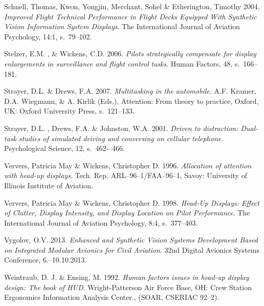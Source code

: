 \documentclass[utf8,bachelor,manualbib]{gradu3}
\begin{document}
\begin{thebibliography}{}
Schnell, Thomas,  Kwon, Yongjin, Merchant, Sohel \& Etherington, Timothy 2004.
\textit{Improved Flight Technical Performance in Flight Decks Equipped With Synthetic Vision Information System Displays}.
The International Journal of Aviation Psychology, 14:1, s.~79--102.

Stelzer, E.M. , \& Wickens, C.D. 2006.
\textit{Pilots strategically compensate for display enlargements in surveillance and flight control tasks}.
Human Factors, 48, s.~166--181.

Strayer, D.L. \& Drews, F.A. 2007.
\textit{Multitasking in the automobile}.
A.F. Kramer, D.A. Wiegmann, \& A. Kirlik (Eds.), Attention: From theory to practice, Oxford, UK: Oxford University Press, s.~121--133.

Strayer, D.L. , Drews, F.A. \& Johnston, W.A. 2001.
\textit{Driven to distraction: Dual-task studies of simulated
driving and conversing on cellular telephone}.
Psychological Science, 12, s.~462-–466.

Ververs, Patricia May \& Wickens, Christopher D. 1996.
\textit{Allocation of attention with head-up displays}.
Tech. Rep. ARL–96–1/FAA–96–1, Savoy: University of Illinois Institute of Aviation.

Ververs, Patricia May \& Wickens, Christopher D. 1998.
\textit{Head-Up Displays: Effect of Clutter, Display Intensity, and Display Location on Pilot Performance}.
The International Journal of Aviation Psychology, 8:4, s.~377--403.

Vygolov, O.V. 2013.
\textit{Enhanced and Synthetic Vision Systems Development Based on Integrated Modular Avionics for Civil Aviation}.
32nd Digital Avionics Systems Conference, 6.--10.10.2013.

Weintraub, D. J. \& Ensing, M. 1992.
\textit{Human factors issues in head-up display design: The book of
HUD}.
Wright-Patterson Air Force Base, OH: Crew Station Ergonomics
Information Analysis Center., (SOAR, CSERIAC 92–2).


\end{thebibliography}
\end{document}
